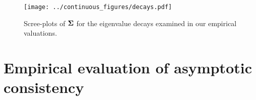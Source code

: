 \begin{figure}[t]
  \texttt{[image: ../continuous\_figures/decays.pdf]}
  \vspace{-1cm}
  \caption{Scree-plots of $\mathbf{\Sigma}$ for the eigenvalue decays examined
    in our empirical valuations.
  }
  \label{fig:eig-decays}
\end{figure}


\section{Empirical evaluation of asymptotic consistency}
\label{sec:asymp-conj-details}


%
%
%


